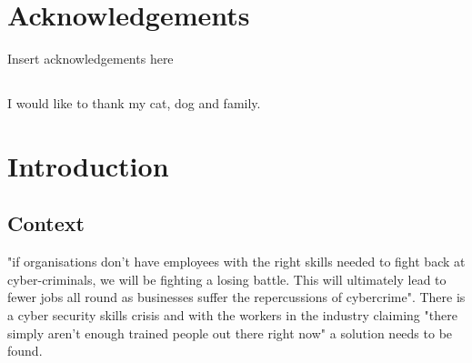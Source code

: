 \documentclass[12pt,a4paper]{article}
\begin{document}
\tableofcontents %
\newpage

\listoftables
\newpage

\listoffigures
\newpage

\section*{Acknowledgements}
Insert acknowledgements here
\subsection*{}
	I would like to thank my cat, dog and family.
\newpage

\setcounter{page}{1}

\section{Introduction}  
\subsection{Context} 
"if organisations don't have employees with the right skills needed to fight back at cyber-criminals, we will be fighting a losing battle. This will ultimately lead to fewer jobs all round as businesses suffer the repercussions of cybercrime". There is a cyber security skills crisis and with the workers in the industry claiming "there simply aren't enough trained people out there right now" \cite{caldwell2013plugging} a solution needs to be found.  
\end{document}
